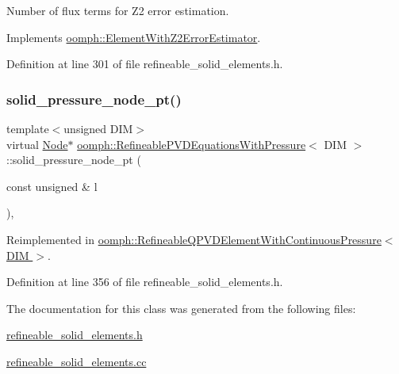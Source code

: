 Number of \textquotesingle{}flux\textquotesingle{} terms for Z2 error estimation. 



Implements \hyperlink{classoomph_1_1ElementWithZ2ErrorEstimator_ae82c5728902e13da31be19c390fc28e3}{oomph\+::\+Element\+With\+Z2\+Error\+Estimator}.



Definition at line 301 of file refineable\+\_\+solid\+\_\+elements.\+h.

\mbox{\label{classoomph_1_1RefineablePVDEquationsWithPressure_a4e94b11315f8345030fa4b3b923bd91b}} 
\subsubsection{\texorpdfstring{solid\+\_\+pressure\+\_\+node\+\_\+pt()}{solid\_pressure\_node\_pt()}}
{\footnotesize\ttfamily template$<$unsigned D\+IM$>$ \\
virtual \hyperlink{classoomph_1_1Node}{Node}$\ast$ \hyperlink{classoomph_1_1RefineablePVDEquationsWithPressure}{oomph\+::\+Refineable\+P\+V\+D\+Equations\+With\+Pressure}$<$ D\+IM $>$\+::solid\+\_\+pressure\+\_\+node\+\_\+pt (\begin{DoxyParamCaption}\item[{const unsigned \&}]{l }\end{DoxyParamCaption})\hspace{0.3cm}{\ttfamily [inline]}, {\ttfamily [virtual]}}



Reimplemented in \hyperlink{classoomph_1_1RefineableQPVDElementWithContinuousPressure_a78ac41286548a45383abb385a1be4598}{oomph\+::\+Refineable\+Q\+P\+V\+D\+Element\+With\+Continuous\+Pressure$<$ D\+I\+M $>$}.



Definition at line 356 of file refineable\+\_\+solid\+\_\+elements.\+h.



The documentation for this class was generated from the following files\+:\begin{DoxyCompactItemize}
\item 
\hyperlink{refineable__solid__elements_8h}{refineable\+\_\+solid\+\_\+elements.\+h}\item 
\hyperlink{refineable__solid__elements_8cc}{refineable\+\_\+solid\+\_\+elements.\+cc}\end{DoxyCompactItemize}
